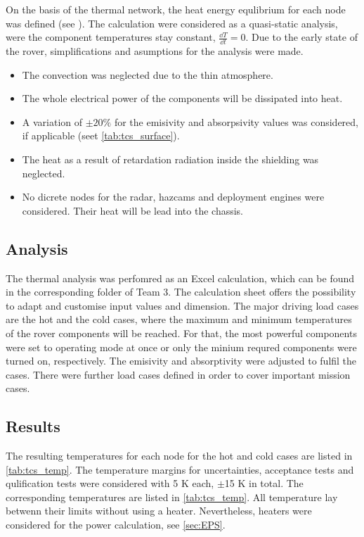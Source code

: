 On the basis of the thermal network, the heat energy equlibrium for each node was defined (see ).
The calculation were considered as a quasi-static analysis, were the component temperatures stay constant, $\frac{\dd T}{\dd t}=0$.
Due to the early state of the rover, simplifications and asumptions for the analysis were made.
\begin{itemize}
	\item The convection was neglected due to the thin atmosphere.
	\item The whole electrical power of the components will be dissipated into heat.
	\item A variation of $\pm 20\%$ for the emisivity and absorpsivity values was considered, if applicable (seet \autoref{tab:tcs_surface}).
	\item The heat as a result of retardation radiation inside the shielding was neglected.
	\item No dicrete nodes for the radar, hazcams and deployment engines were considered. Their heat will be lead into the chassis.
\end{itemize}


\subsection{Analysis}
The thermal analysis was perfomred as an Excel calculation, which can be found in the corresponding folder of Team 3.
The calculation sheet offers the possibility to adapt and customise input values and dimension.
The major driving load cases are the  hot and the cold cases, where the maximum and minimum temperatures of the rover components will be reached.
For that, the most powerful components were set to operating mode at once or only the minium requred components were turned on, respectively.
The emisivity and absorptivity were adjusted to fulfil the cases.
There were further load cases defined in order to cover important mission cases.

\subsection{Results}
The resulting temperatures for each node for the hot and cold cases  are listed in \autoref{tab:tcs_temp}.
The temperature margins for uncertainties, acceptance tests and qulification tests were considered with 5 K each, $\pm$15 K in total.
The corresponding temperatures are listed in \autoref{tab:tcs_temp}.
All temperature lay betwenn their limits without using a heater.
Nevertheless, heaters were considered for the power calculation, see \autoref{sec:EPS}.

